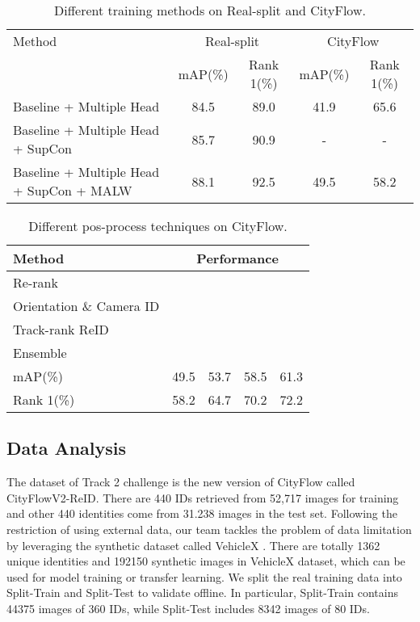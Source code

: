 \documentclass[10pt,twocolumn,letterpaper]{article}
\begin{document}
\begin{table*}[h!]
	\centering
	\begin{tabular}{l|cc|cc}
		\hline
		Method & \multicolumn{2}{c}{Real-split} & \multicolumn{2}{c}{CityFlow}\\
		& mAP(\%)  & Rank 1(\%) & mAP(\%) & Rank 1(\%) \\
		\hline\hline
		Baseline + Multiple Head & 84.5 & 89.0  & 41.9 & 65.6  \\
		\hline
		Baseline + Multiple Head + SupCon & 85.7   & 90.9 & - & -  \\
		\hline
		Baseline + Multiple Head + SupCon + MALW & 88.1  & 92.5 & 49.5 & 58.2  \\
		\hline
	\end{tabular}
	\caption{Different training methods on Real-split and CityFlow.}
	\label{tab:method}
\end{table*}

\begin{table}
	\centering
	\begin{tabular}{l|cccc}
		\hline
		Method & \multicolumn{4}{c}{Performance} \\
		\hline\hline
		Re-rank & \checkmark  & \checkmark  & \checkmark  & \checkmark  \\
		Orientation \& Camera ID && \checkmark  & \checkmark  & \checkmark \\
		Track-rank ReID &&& \checkmark  & \checkmark \\
		Ensemble &&&& \checkmark \\
		\hline
		mAP(\%)  & 49.5  & 53.7  & 58.5 & 61.3 \\
		Rank 1(\%) & 58.2 & 64.7  & 70.2 & 72.2 \\
		\hline
	\end{tabular}
	\caption{Different pos-process techniques on CityFlow.}
	\label{tab:posprocess}
\end{table}

\subsection{Data Analysis}
The dataset of Track 2 challenge is the new version of CityFlow called CityFlowV2-ReID. There are 440 IDs retrieved from 52,717 images for training and other 440 identities come from 31.238 images in the test set. Following the restriction of using external data, our team tackles the problem of data limitation by leveraging the synthetic dataset called VehicleX \cite{vehicleX}. There are totally 1362 unique identities and 192150 synthetic images in VehicleX dataset, which can be used for model training or transfer learning. We split the real training data into Split-Train and Split-Test to validate offline. In particular, Split-Train contains 44375 images of 360 IDs, while Split-Test includes 8342 images of 80 IDs.
\end{document}
